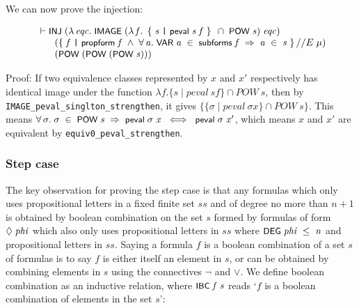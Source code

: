 \documentclass[letterpaper]{article}
\renewcommand{\HOLConst}[1]{{\textsf{\upshape\small #1}}}
\renewcommand{\HOLinline}[1]{\ensuremath{#1}}
\newenvironment{holmath}{\begin{displaymath}\begin{array}{l}}{\end{array}\end{displaymath}\ignorespacesafterend}
\begin{document}
We can now prove the injection:

\begin{holmath}
  \ensuremath{\HOLTokenTurnstile}\HOLConst{INJ}\;(\HOLTokenLambda{}\HOLBoundVar{eqc}.\;\HOLConst{IMAGE}\;(\HOLTokenLambda{}\HOLBoundVar{f}.\;\HOLTokenLeftbrace{}\HOLBoundVar{s}\;\HOLTokenBar{}\;\HOLConst{peval}\;\HOLBoundVar{s}\;\HOLBoundVar{f}\HOLTokenRightbrace{}\;\HOLSymConst{\HOLTokenInter{}}\;\HOLConst{POW}\;\HOLFreeVar{s})\;\HOLBoundVar{eqc})\\
\;\;\;\;\;\;\;(\HOLTokenLeftbrace{}\HOLBoundVar{f}\;\HOLTokenBar{}\;\HOLConst{propform}\;\HOLBoundVar{f}\;\HOLSymConst{\HOLTokenConj{}}\;\HOLSymConst{\HOLTokenForall{}}\HOLBoundVar{a}.\;\HOLConst{VAR}\;\HOLBoundVar{a}\;\HOLSymConst{\HOLTokenIn{}}\;\HOLConst{subforms}\;\HOLBoundVar{f}\;\HOLSymConst{\HOLTokenImp{}}\;\HOLBoundVar{a}\;\HOLSymConst{\HOLTokenIn{}}\;\HOLFreeVar{s}\HOLTokenRightbrace{}\HOLSymConst{//E}\;\HOLFreeVar{\ensuremath{\mu}})\\
\;\;\;\;\;\;\;(\HOLConst{POW}\;(\HOLConst{POW}\;(\HOLConst{POW}\;\HOLFreeVar{s})))
\end{holmath}

Proof: If two equivalence classes represented by $x$ and $x'$ respectively has identical image under the function $\lambda f. \{s \mid peval\ s f\} \cap POW \ s$, then by \texttt{IMAGE_peval_singlton_strengthen}, it gives $ \{\{\sigma \mid peval\ \sigma x\} \cap POW\ s\}$. This means \HOLinline{\HOLSymConst{\HOLTokenForall{}}\HOLBoundVar{\ensuremath{\sigma}}.\;\HOLBoundVar{\ensuremath{\sigma}}\;\HOLSymConst{\HOLTokenIn{}}\;\HOLConst{POW}\;\HOLFreeVar{s}\;\HOLSymConst{\HOLTokenImp{}}\;\HOLConst{peval}\;\HOLBoundVar{\ensuremath{\sigma}}\;\HOLFreeVar{x}\;\HOLSymConst{\HOLTokenEquiv{}}\;\HOLConst{peval}\;\HOLBoundVar{\ensuremath{\sigma}}\;\HOLFreeVar{x\sp{\prime}}}, which means $x$ and $x'$ are equivalent by \texttt{equiv0_peval_strengthen}.



\subsubsection{Step case}

The key observation for proving the step case is that any formulas which only uses propositional letters in a fixed finite set $ss$ and of degree no more than $n+1$ is obtained by boolean combination on the set $s$ formed by formulas of form \HOLinline{\HOLSymConst{\ensuremath{\Diamond}}\;\HOLFreeVar{phi}} which also only uses propositional letters in $ss$ where \HOLinline{\HOLConst{DEG}\;\HOLFreeVar{phi}\;\HOLSymConst{\HOLTokenLeq{}}\;\HOLFreeVar{n}} and propositional letters in $ss$. Saying a formula $f$ is a boolean combination of a set $s$ of formulas is to say $f$ is either itself an element in $s$, or can be obtained by combining elements in $s$ using the connectives $\lnot$ and $\lor$. We define boolean combination as an inductive relation, where \HOLinline{\HOLConst{IBC}\;\HOLFreeVar{f}\;\HOLFreeVar{s}} reads `$f$ is a boolean combination of elements in the set $s$':
\end{document}
